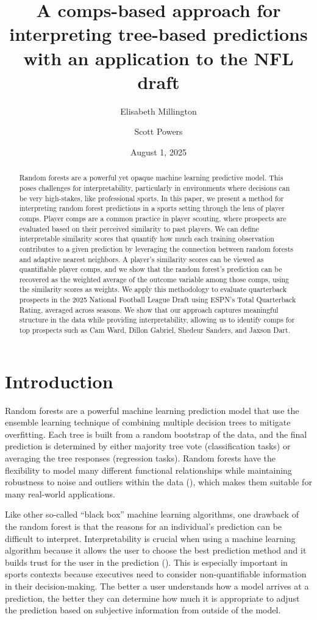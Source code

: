 \documentclass{article}
\title{A comps-based approach for interpreting tree-based predictions with an application to the NFL draft}
\author[1]{Elisabeth Millington}
\author[2]{Scott Powers}
\affil[1]{Department of Kinesiology, Rice University}
\affil[2]{Department of Sport Management, Rice University}
\date{August 1, 2025}
\begin{document}
\maketitle

\begin{abstract}
  Random forests are a powerful yet opaque machine learning predictive model. This poses challenges for interpretability, particularly in environments where decisions can be very high-stakes, like professional sports. In this paper, we present a method for interpreting random forest predictions in a sports setting through the lens of player comps. Player comps are a common practice in player scouting, where prospects are evaluated based on their perceived similarity to past players. We can define interpretable similarity scores that quantify how much each training observation contributes to a given prediction by leveraging the connection between random forests and adaptive nearest neighbors. A player's similarity scores can be viewed as quantifiable player comps, and we show that the random forest's prediction can be recovered as the weighted average of the outcome variable among those comps, using the similarity scores as weights. We apply this methodology to evaluate quarterback prospects in the 2025 National Football League Draft using ESPN's Total Quarterback Rating, averaged across seasons. We show that our approach captures meaningful structure in the data while providing interpretability, allowing us to identify comps for top prospects such as Cam Ward, Dillon Gabriel, Shedeur Sanders, and Jaxson Dart.
\end{abstract}

\section{Introduction}

Random forests are a powerful machine learning prediction model that use the ensemble learning technique of combining multiple decision trees to mitigate overfitting. Each tree is built from a random bootstrap of the data, and the final prediction is determined by either majority tree vote (classification tasks) or averaging the tree responses (regression tasks). Random forests have the flexibility to model many different functional relationships while maintaining robustness to noise and outliers within the data (\cite{breiman_random_2001}), which makes them suitable for many real-world applications.

Like other so-called ``black box'' machine learning algorithms, one drawback of the random forest is that the reasons for an individual's prediction can be difficult to interpret. Interpretability is crucial when using a machine learning algorithm because it allows the user to choose the best prediction method and it builds trust for the user in the prediction (\cite{ribeiro_why_2016}). This is especially important in sports contexts because executives need to consider non-quantifiable information in their decision-making. The better a user understands how a model arrives at a prediction, the better they can determine how much it is appropriate to adjust the prediction based on subjective information from outside of the model.
\end{document}
